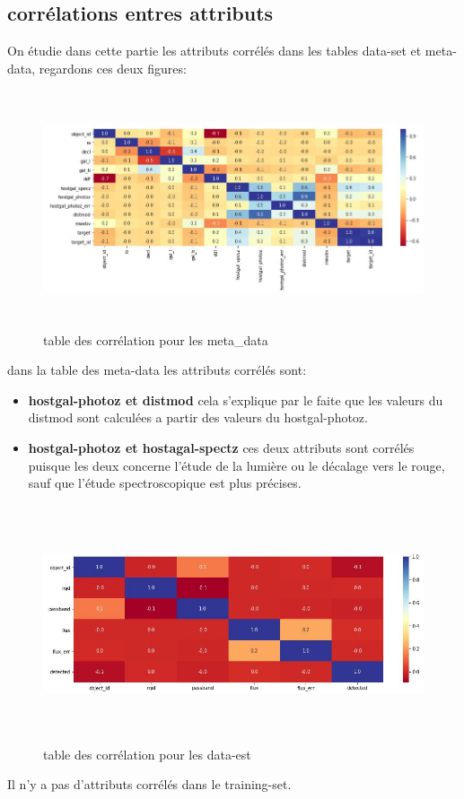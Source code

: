 \subsection{corrélations entres attributs}
On étudie dans cette partie les attributs corrélés dans les tables data-set et meta-data, regardons ces deux figures: 
\newline
\begin{figure}[!h]
    \centering
    \includegraphics[width=12cm,height=7cm]{report/figures/correlation.jpg}
    \caption{table des corrélation pour les meta_data}
    \label{fig:my_label}
\end{figure}

dans la table des meta-data les attributs corrélés sont: 
\begin{itemize}
    \item \textbf{hostgal-photoz et distmod} cela s'explique par le faite que les valeurs du distmod sont calculées a partir des valeurs du hostgal-photoz.
    \item \textbf{hostgal-photoz et hostagal-spectz} ces deux attributs sont corrélés puisque les deux concerne l'étude de la lumière ou le décalage vers le rouge, sauf que l'étude spectroscopique est plus précises.
\end{itemize}
\begin{figure}[!h]
    \centering
    \includegraphics[width=12cm,height=7cm]{report/figures/correlation1.jpg}
    \caption{table des corrélation pour les data-est}
    \label{fig:my_label}
\end{figure}
Il n'y a pas d'attributs corrélés dans le training-set.
\newpage
